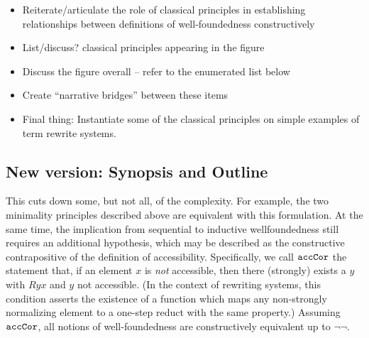 \begin{itemize}
  \item Reiterate/articulate the role of classical principles in establishing relationships between definitions of 
    well-foundedness constructively 
  \item List/discuss? classical principles appearing in the figure 
  \item Discuss the figure overall -- refer to the enumerated list below 
  \item Create ``narrative bridges'' between these items 
  \item Final thing: Instantiate some of the classical principles on simple examples of term rewrite systems.
\end{itemize}


%
%
%
%
\subsection{New version: Synopsis and Outline} 
This cuts down some, but not all, of the complexity.
For example, the two minimality principles
described above are equivalent with this formulation.
At the same time, the
implication from sequential to inductive wellfoundedness
still requires an additional hypothesis, which may be described as the
constructive contrapositive of the definition of accessibility.
Specifically, we call {$\mathtt{accCor}$} the statement that, if an element $x$
is \emph{not} accessible, then there (strongly) exists a $y$ with $Ryx$
and $y$ not accessible.  (In the context of rewriting systems,
this condition asserts the existence of a function which maps any
non-strongly normalizing element to a one-step reduct with the same property.)
Assuming $\mathtt{accCor}$, all notions of well-foundedness
are constructively equivalent up to $\lnot\lnot$.

